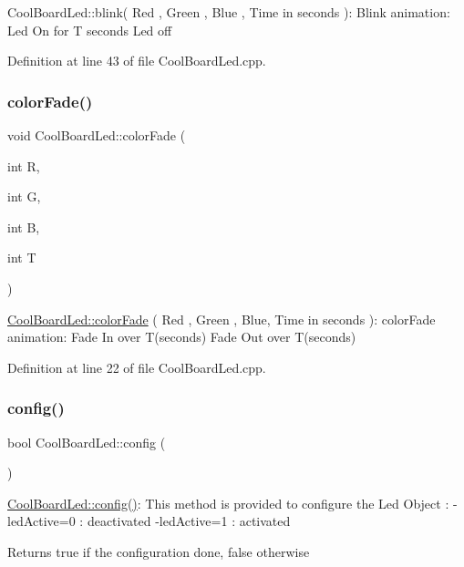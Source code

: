 Cool\+Board\+Led\+::blink( Red , Green , Blue , Time in seconds )\+: Blink animation\+: Led On for T seconds Led off 

Definition at line 43 of file Cool\+Board\+Led.\+cpp.

\mbox{\label{class_cool_board_led_a6dbfe23988f43e1242cd05e69b13ff30}} 
\subsubsection{\texorpdfstring{color\+Fade()}{colorFade()}}
{\footnotesize\ttfamily void Cool\+Board\+Led\+::color\+Fade (\begin{DoxyParamCaption}\item[{int}]{R,  }\item[{int}]{G,  }\item[{int}]{B,  }\item[{int}]{T }\end{DoxyParamCaption})}

\hyperlink{class_cool_board_led_a6dbfe23988f43e1242cd05e69b13ff30}{Cool\+Board\+Led\+::color\+Fade} ( Red , Green , Blue, Time in seconds )\+: color\+Fade animation\+: Fade In over T(seconds) Fade Out over T(seconds) 

Definition at line 22 of file Cool\+Board\+Led.\+cpp.

\mbox{\label{class_cool_board_led_a1b60e5e30bea96c49ed62ed1bf1ffc8b}} 
\subsubsection{\texorpdfstring{config()}{config()}}
{\footnotesize\ttfamily bool Cool\+Board\+Led\+::config (\begin{DoxyParamCaption}{ }\end{DoxyParamCaption})}

\hyperlink{class_cool_board_led_a1b60e5e30bea96c49ed62ed1bf1ffc8b}{Cool\+Board\+Led\+::config()}\+: This method is provided to configure the Led Object \+: -\/led\+Active=0 \+: deactivated -\/led\+Active=1 \+: activated \begin{DoxyReturn}{Returns}
true if the configuration done, false otherwise 
\end{DoxyReturn}


